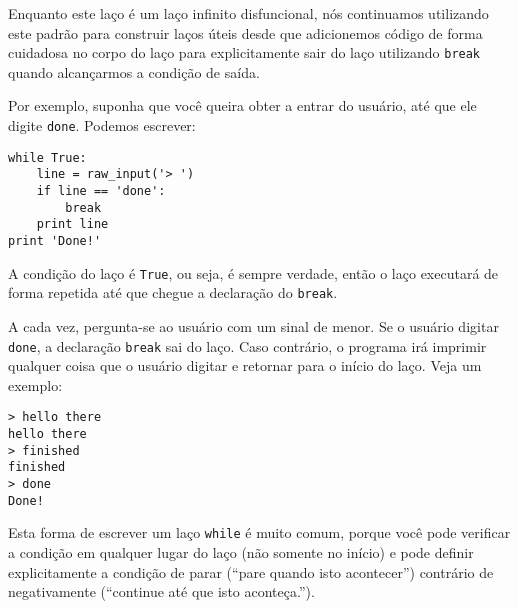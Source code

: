 Enquanto este laço é um laço infinito disfuncional, nós continuamos utilizando
este padrão para construir laços úteis desde que adicionemos código de forma
cuidadosa no corpo do laço para explicitamente sair do laço utilizando 
{\tt break} quando alcançarmos a condição de saída.


Por exemplo, suponha que você queira obter a entrar do usuário, até que ele
digite {\tt done}. Podemos escrever:

\beforeverb
\begin{verbatim}
while True:
    line = raw_input('> ')
    if line == 'done':
        break
    print line
print 'Done!'
\end{verbatim}
\afterverb
%

%
A condição do laço é {\tt True}, ou seja, é sempre verdade, então o laço
executará de forma repetida até que chegue a declaração do {\tt break}.


A cada vez, pergunta-se ao usuário com um sinal de menor. Se o usuário
digitar {\tt done}, a declaração {\tt break} sai do laço. Caso contrário, o
programa irá imprimir qualquer coisa que o usuário digitar e retornar para o
início do laço. Veja um exemplo:

\beforeverb
\begin{verbatim}
> hello there
hello there
> finished
finished
> done
Done!
\end{verbatim}
\afterverb
%

%
Esta forma de escrever um laço {\tt while} é muito comum, porque você pode
verificar a condição em qualquer lugar do laço (não somente no início) e
pode definir explicitamente a condição de parar (``pare quando isto acontecer'')
contrário de negativamente (``continue até que isto aconteça.'').

